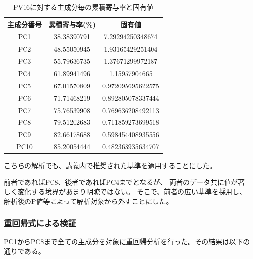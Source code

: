 \documentclass[11pt,a4paper, uplatex]{jsarticle}
\begin{document}
\begin{table}[htbp]
  \begin{center}
    \caption{PV16に対する主成分毎の累積寄与率と固有値}
    \begin{tabular}{c|c|c}
      \hline
      主成分番号 & 累積寄与率(\%) & 固有値 \\ \hline \hline
      PC1 & 38.38390791 & 7.29294250348674 \\
      PC2 & 48.55050945 & 1.93165429251404 \\
      PC3 & 55.79636735 & 1.37671299972187 \\
      PC4 & 61.89941496 & 1.15957904665 \\
      PC5 & 67.01570809 & 0.972095695622575 \\
      PC6 & 71.71468219 & 0.892805078337444 \\
      PC7 & 75.76539908 & 0.769636208492113 \\
      PC8 & 79.51202683 & 0.711859273699518 \\
      PC9 & 82.66178688 & 0.598454408935556 \\
      PC10 & 85.20054444 & 0.482363935634707 \\
      \hline
    \end{tabular}
  \end{center}
\end{table}

こちらの解析でも、講義内で推奨された基準を適用することにした。

前者であればPC8、後者であればPC4までとなるが、
両者のデータ共に値が著しく変化する境界があまり明瞭ではない。
そこで、前者の広い基準を採用し、解析後のP値等によって解析対象から外すことにした。

\subsubsection{重回帰式による検証}
PC1からPC8まで全ての主成分を対象に重回帰分析を行った。その結果は以下の通りである。
\end{document}
